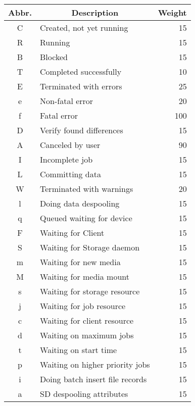 \begin{longtable}{ | c | l | r | }
\hline
\textbf{Abbr.} & \multicolumn{1}{c|}{\textbf{Description}} & \textbf{Weight} \\
\hline
\hline
C & Created, not yet running & 15 \\
R & Running & 15 \\
B & Blocked & 15 \\
T & Completed successfully & 10 \\
E & Terminated with errors & 25 \\
e & Non-fatal error & 20 \\
f & Fatal error & 100 \\
D & Verify found differences & 15 \\
A & Canceled by user & 90 \\
I & Incomplete job & 15 \\
L & Committing data & 15 \\
W & Terminated with warnings & 20 \\
l & Doing data despooling & 15 \\
q & Queued waiting for device & 15 \\
F & Waiting for Client & 15 \\
S & Waiting for Storage daemon & 15 \\
m & Waiting for new media & 15 \\
M & Waiting for media mount & 15 \\
s & Waiting for storage resource & 15 \\
j & Waiting for job resource & 15 \\
c & Waiting for client resource & 15 \\
d & Waiting on maximum jobs & 15 \\
t & Waiting on start time & 15 \\
p & Waiting on higher priority jobs & 15 \\
i & Doing batch insert file records & 15 \\
a & SD despooling attributes & 15 \\
\hline
\end{longtable}
